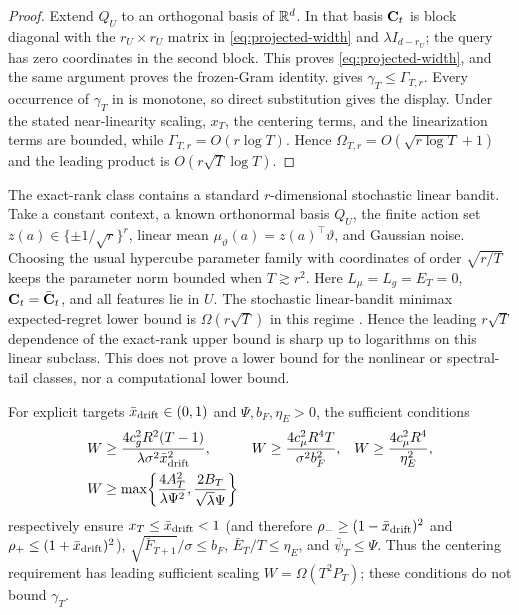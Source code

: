 \begin{proof}
Extend $Q_U$ to an orthogonal basis of $\mathbb{R}^d$.  In that basis $\mathbf{C}_t$ is block
diagonal with the $r_U\times r_U$ matrix in \eqref{eq:projected-width} and
$\lambda I_{d-r_U}$; the query has zero coordinates in the second block.  This
proves \eqref{eq:projected-width}, and the same argument proves the frozen-Gram
identity.   gives $\gamma_T\le\Gamma_{T,r}$.  Every occurrence of
$\gamma_T$ in  is monotone, so direct substitution gives
the display.  Under the stated near-linearity scaling, $x_T$, the centering terms, and
the linearization terms are bounded, while
$\Gamma_{T,r}=O(r\log T)$.  Hence
$\Omega_{T,r}=O(\sqrt{r\log T}+1)$ and the leading product is
$O(r\sqrt T\log T)$.
\end{proof}

\begin{remark}
The exact-rank class contains a standard $r$-dimensional stochastic linear
bandit.  Take a constant context, a known orthonormal basis $Q_U$, the finite
action set $z(a)\in\{\pm1/\sqrt r\}^r$, linear mean
$\mu_\vartheta(a)=z(a)^\top\vartheta$, and Gaussian noise.  Choosing the usual
hypercube parameter family with coordinates of order $\sqrt{r/T}$ keeps the
parameter norm bounded when $T\gtrsim r^2$.  Here $L_\mu=L_g=E_T=0$,
$\mathbf{C}_t=\bar{\mathbf{C}}_t$, and all features lie in $U$.  The stochastic linear-bandit
minimax expected-regret lower bound is $\Omega(r\sqrt T)$ in this regime
\citep{dani2008stochastic}.  Hence the leading $r\sqrt T$ dependence of the
exact-rank upper bound is sharp up to logarithms on this linear subclass.  This
does not prove a lower bound for the nonlinear or spectral-tail classes, nor a
computational lower bound.
\end{remark}

For explicit targets
$\bar x_{\rm drift}\in(0,1)$ and $\Psi,b_F,\eta_E>0$, the sufficient conditions
\begin{equation}\label{eq:width-thresholds}
\begin{aligned}
W&\ge\frac{4c_g^2R^2(T-1)}{\lambda\sigma^2\bar x_{\rm drift}^2},&
W&\ge\frac{4c_\mu^2R^4T}{\sigma^2b_F^2},&
W&\ge\frac{4c_\mu^2R^4}{\eta_E^2},\\
W&\ge\max\!\left\{\frac{4A_T^2}{\lambda\Psi^2},
\frac{2B_T}{\sqrt\lambda\Psi}\right\}
\end{aligned}
\end{equation}
respectively ensure $x_T\le\bar x_{\rm drift}<1$ (and therefore
$\rho_-\ge(1-\bar x_{\rm drift})^2$ and
$\rho_+\le(1+\bar x_{\rm drift})^2$),
$\sqrt{\bar F_{T+1}}/\sigma\le b_F$,
$\bar E_T/T\le\eta_E$, and $\bar\psi_T\le\Psi$.  Thus the centering
requirement has leading sufficient scaling $W=\Omega(T^2P_T)$; these
conditions do not bound $\gamma_T$.

